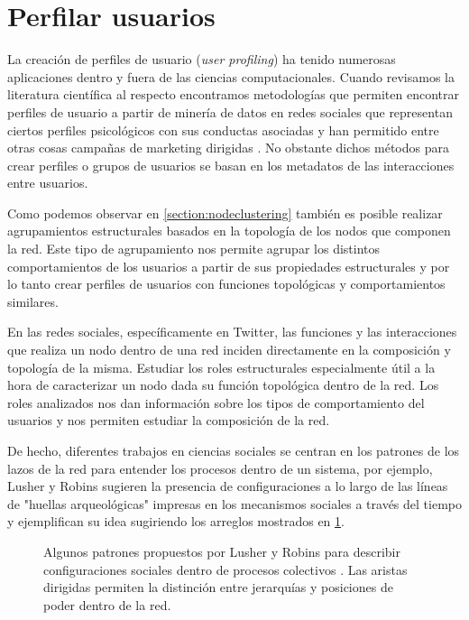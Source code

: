 \section{Perfilar usuarios}
\label{sec:proposal:users}

 La creación de perfiles de usuario (\textit{user profiling}) ha tenido numerosas aplicaciones dentro y fuera de las ciencias computacionales. Cuando revisamos la literatura científica al respecto encontramos metodologías que permiten encontrar perfiles de usuario a partir de minería de datos en redes sociales que representan ciertos perfiles psicológicos con sus conductas asociadas y han permitido entre otras cosas campañas de marketing dirigidas \cite{hu_cambridge_2020}. No obstante dichos métodos para crear perfiles o grupos de usuarios se basan en los metadatos de las interacciones entre usuarios.
 
Como podemos observar en \ref{section:nodeclustering} también es posible realizar agrupamientos estructurales basados en la topología de los nodos que componen la red. Este tipo de agrupamiento nos permite agrupar los distintos comportamientos de los usuarios a partir de sus propiedades estructurales y por lo tanto crear perfiles de usuarios con funciones topológicas y comportamientos similares.
 
En las redes sociales, específicamente en Twitter, las funciones y las interacciones que realiza un nodo dentro de una red inciden directamente en la composición y topología de la misma. Estudiar los roles estructurales especialmente útil a la hora de caracterizar un nodo dada su función topológica dentro de la red. Los roles analizados nos dan información sobre los tipos de comportamiento del usuarios y nos permiten estudiar la composición de la red.

De hecho, diferentes trabajos en ciencias sociales se centran en los patrones de los lazos de la red para entender los procesos dentro de un sistema, por ejemplo, Lusher y Robins sugieren la presencia de configuraciones a lo largo de las líneas de "huellas arqueológicas" impresas en los mecanismos sociales a través del tiempo y ejemplifican su idea sugiriendo los arreglos mostrados en \ref{fig:lusher}.

\begin{figure}[htbp]
  \centering
  
    \caption{Algunos patrones propuestos por Lusher y Robins para describir configuraciones sociales dentro de procesos colectivos \citep{lusher_exponential_nodate}. Las aristas dirigidas permiten la distinción entre jerarquías y posiciones de poder dentro de la red.}
    \label{fig:lusher}
\end{figure}

